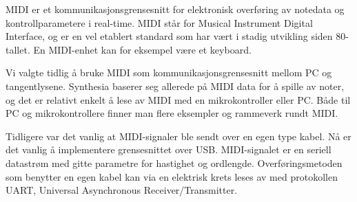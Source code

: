 MIDI er et kommunikasjonsgrensesnitt for elektronisk overføring av notedata og kontrollparametere i real-time. MIDI står for Musical Instrument Digital Interface\cite{midi}, og er en vel etablert standard som har vært i stadig utvikling siden 80-tallet. En MIDI-enhet kan for eksempel være et keyboard.

Vi valgte tidlig å bruke MIDI som kommunikasjonsgrensesnitt mellom PC og tangentlysene. Synthesia baserer seg allerede på MIDI data for å spille av noter, og det er relativt enkelt å lese av MIDI med en mikrokontroller eller PC. Både til PC og mikrokontrollere finner man flere eksempler og rammeverk rundt MIDI.

Tidligere var det vanlig at MIDI-signaler ble sendt over en egen type kabel. Nå er det vanlig å implementere grensesnittet over USB. MIDI-signalet er en seriell datastrøm med gitte parametre for hastighet og ordlengde. Overføringsmetoden som benytter en egen kabel kan via en elektrisk krets leses av med protokollen UART, Universal Asynchronous Receiver/Transmitter.